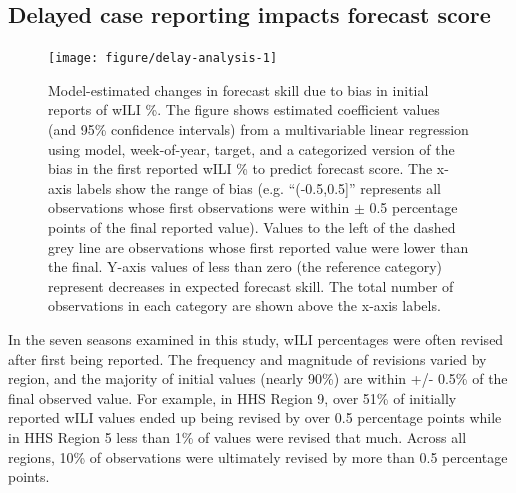 \documentclass[9pt,twocolumn,twoside]{pnas-new}\usepackage[]{graphicx}\usepackage[]{color}
\newenvironment{knitrout}{}{} %
\begin{document}


\subsection*{Delayed case reporting impacts forecast score}\label{sec:delays}
\begin{knitrout}
\color{fgcolor}\begin{figure}
\texttt{[image: figure/delay-analysis-1]} \caption[Model-estimated changes in forecast skill due to bias in initial reports of wILI \%]{Model-estimated changes in forecast skill due to bias in initial reports of wILI \%. The figure shows estimated coefficient values (and 95\% confidence intervals) from a multivariable linear regression using model, week-of-year, target, and a categorized version of the bias in the first reported wILI \% to predict forecast score.  The x-axis labels show the range of bias (e.g. ``(-0.5,0.5]'' represents all observations whose first observations were within $\pm$ 0.5 percentage points of the final reported value). Values to the left of the dashed grey line are observations whose first reported value were lower than the final. Y-axis values of less than zero (the reference category) represent decreases in expected forecast skill. The total number of observations in each category are shown above the x-axis labels.}\label{fig:delay-analysis}
\end{figure}


\end{knitrout}

In the seven seasons examined in this study, wILI percentages were often revised after first being reported. 
The frequency and magnitude of revisions varied by region, and the majority of initial values (nearly 90\%) are within +/- 0.5\% of the final observed value.
For example, in HHS Region 9, over 51\% of initially reported wILI values ended up being revised by over 0.5 percentage points while in HHS Region 5 less than 1\% of values were revised that much. %
Across all regions, 10\% of observations were ultimately revised by more than 0.5 percentage points.
\end{document}
